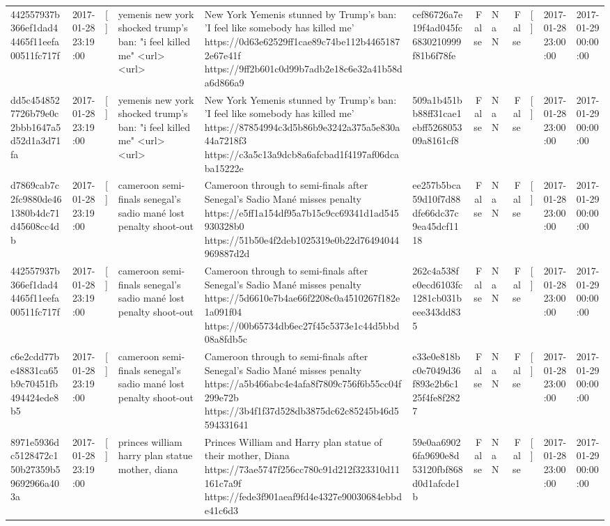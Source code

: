 \begin{tabular}{llllllrlrlll}
442557937b366ef1dad44465f11eefa00511fc717f & 2017-01-28 23:19:00 & [] & yemenis new york shocked trump's ban: "i feel killed me" <url> <url> & New York Yemenis stunned by Trump's ban: 'I feel like somebody has killed me' https://0d63e62529ff1cae89c74be112b44651872e67e41f https://9ff2b601c0d99b7adb2e18c6e32a41b58da6d866a9 & cef86726a7e19f4ad045fc6830210999f81b6f78fe & False & NaN & False & [] & 2017-01-28 23:00:00 & 2017-01-29 00:00:00 \\
dd5c4548527726b79e0c2bbb1647a5d52d1a3d71fa & 2017-01-28 23:19:00 & [] & yemenis new york shocked trump's ban: "i feel killed me" <url> <url> & New York Yemenis stunned by Trump's ban: 'I feel like somebody has killed me' https://87854994c3d5b86b9e3242a375a5e830a44a7218f3 https://c3a5c13a9dcb8a6afcbad1f4197af06dcaba15222e & 509a1b451bb88ff31cae1ebff526805309a8161cf8 & False & NaN & False & [] & 2017-01-28 23:00:00 & 2017-01-29 00:00:00 \\
d7869cab7c2fc9880de461380b4dc71d45608cc4db & 2017-01-28 23:19:00 & [] & cameroon semi-finals senegal's sadio mané lost penalty shoot-out & Cameroon through to semi-finals after Senegal’s Sadio Mané misses penalty https://e5ff1a154df95a7b15c9cc69341d1ad545930328b0 https://51b50e4f2deb1025319e0b22d76494044969887d2d & ee257b5bca59d10f7d88dfe66dc37c9ea45dcf1118 & False & NaN & False & [] & 2017-01-28 23:00:00 & 2017-01-29 00:00:00 \\
442557937b366ef1dad44465f11eefa00511fc717f & 2017-01-28 23:19:00 & [] & cameroon semi-finals senegal's sadio mané lost penalty shoot-out & Cameroon through to semi-finals after Senegal’s Sadio Mané misses penalty https://5d6610e7b4ae66f2208c0a4510267f182e1a091f04 https://00b65734db6ec27f45c5373e1c44d5bbd08a8fdb5c & 262c4a538fe0ecd6103fc1281cb031beee343dd835 & False & NaN & False & [] & 2017-01-28 23:00:00 & 2017-01-29 00:00:00 \\
c6e2cdd77be48831ca65b9c70451fb494424ede8b5 & 2017-01-28 23:19:00 & [] & cameroon semi-finals senegal's sadio mané lost penalty shoot-out & Cameroon through to semi-finals after Senegal’s Sadio Mané misses penalty https://a5b466abc4e4afa8f7809c756f6b55cc04f299e72b https://3b4f1f37d528db3875dc62c85245b46d5594331641 & e33e0e818bc0e7049d36f893e2b6c125f4fe8f2827 & False & NaN & False & [] & 2017-01-28 23:00:00 & 2017-01-29 00:00:00 \\
8971e5936dc5128472c150b27359b59692966a403a & 2017-01-28 23:19:00 & [] & princes william harry plan statue mother, diana & Princes William and Harry plan statue of their mother, Diana https://73ae5747f256cc780c91d212f323310d11161c7a9f https://fede3f901aeaf9fd4e4327e90030684ebbde41c6d3 & 59e0aa69026fa9690e8d53120fbf868d0d1afcde1b & False & NaN & False & [] & 2017-01-28 23:00:00 & 2017-01-29 00:00:00 \\

\end{tabular}
